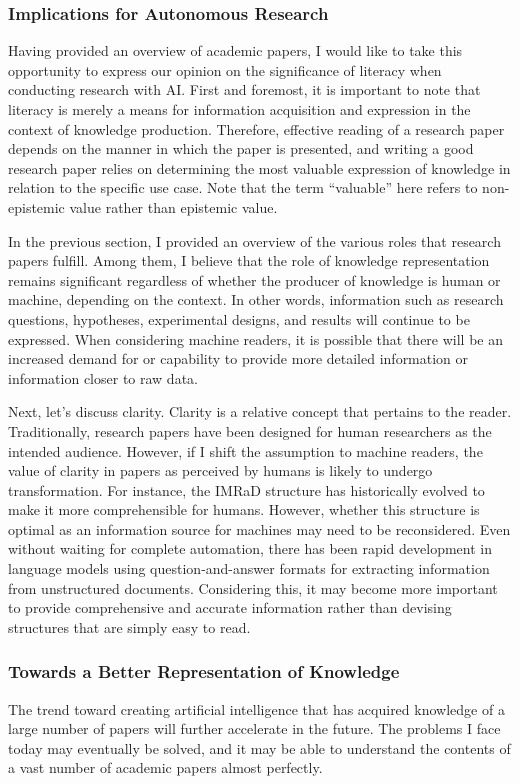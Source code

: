 \documentclass{book}
\begin{document}
\subsubsection{Implications for Autonomous Research}
Having provided an overview of academic papers, I would like to take this opportunity to express our opinion on the significance of literacy when conducting research with AI. First and foremost, it is important to note that literacy is merely a means for information acquisition and expression in the context of knowledge production. Therefore, effective reading of a research paper depends on the manner in which the paper is presented, and writing a good research paper relies on determining the most valuable expression of knowledge in relation to the specific use case. Note that the term ``valuable'' here refers to non-epistemic value rather than epistemic value.

In the previous section, I provided an overview of the various roles that research papers fulfill. Among them, I believe that the role of knowledge representation remains significant regardless of whether the producer of knowledge is human or machine, depending on the context. In other words, information such as research questions, hypotheses, experimental designs, and results will continue to be expressed. When considering machine readers, it is possible that there will be an increased demand for or capability to provide more detailed information or information closer to raw data.

Next, let's discuss clarity. Clarity is a relative concept that pertains to the reader. Traditionally, research papers have been designed for human researchers as the intended audience. However, if I shift the assumption to machine readers, the value of clarity in papers as perceived by humans is likely to undergo transformation. For instance, the IMRaD structure has historically evolved to make it more comprehensible for humans. However, whether this structure is optimal as an information source for machines may need to be reconsidered. Even without waiting for complete automation, there has been rapid development in language models using question-and-answer formats for extracting information from unstructured documents. Considering this, it may become more important to provide comprehensive and accurate information rather than devising structures that are simply easy to read.

\subsubsection{Towards a Better Representation of Knowledge}
The trend toward creating artificial intelligence that has acquired knowledge of a large number of papers will further accelerate in the future. The problems I face today may eventually be solved, and it may be able to understand the contents of a vast number of academic papers almost perfectly. 
\end{document}

